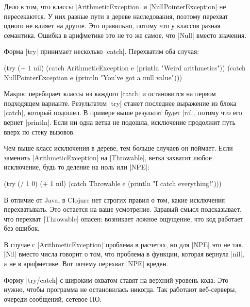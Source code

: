 Дело в том, что классы \spverb|ArithmeticException| и
\spverb|NullPointerException| не пересекаются. У них разные пути в дереве
наследования, поэтому перехват одного не влияет на другое. Это правильно, потому
что у классов разная семантика. Ошибка в арифметике это не то же самое, что
\spverb|Null| вместо значения.

Форма \spverb|try| принимает несколько \spverb|catch|. Перехватим оба случая:

\begin{english}
  \begin{clojure}
(try
  (+ 1 nil)
  (catch ArithmeticException e
    (println "Weird arithmetics"))
  (catch NullPointerException e
    (println "You've got a null value")))
  \end{clojure}
\end{english}

Макрос перебирает классы из каждого \spverb|catch| и остановится на первом
подходящем варианте. Результатом \spverb|try| станет последнее выражение из
блока \spverb|catch|, который подошел. В примере выше результат будет
\spverb|nil|, потому что его вернет \spverb|println|. Если ни одна ветка не
подошла, исключение продолжит путь вверх по стеку вызовов.

Чем выше класс исключения в дереве, тем больше случаев он поймает. Если заменить
\spverb|ArithmeticException| на \spverb|Throwable|, ветка захватит любое
исключение, будь то деление на ноль или \spverb|NPE|:

\begin{english}
  \begin{clojure}
(try
  (/ 1 0)
  (+ 1 nil)
  (catch Throwable e
    (println "I catch everything!")))
  \end{clojure}
\end{english}

В отличие от Java, в Clojure нет строгих правил о том, какие исключения
перехватывать. Это остается на ваше усмотрение. Здравый смысл подсказывает, что
перехват \spverb|Throwable| опасен: возникает ложное ощущение, что код работает
без ошибок.

В случае с \spverb|ArithmeticException| проблема в расчетах, но для \spverb|NPE|
это не так. \spverb|Nil| вместо числа говорит о том, что проблема в функции,
которая вернула \spverb|nil|, а не в арифметике. Вот почему перехват
\spverb|NPE| вреден.

Форму \spverb|try/catch| с широким охватом ставят на верхний уровень кода. Это
нужно, чтобы программа не остановилась никогда. Так работают веб-серверы,
очереди сообщений, сетевое ПО.

